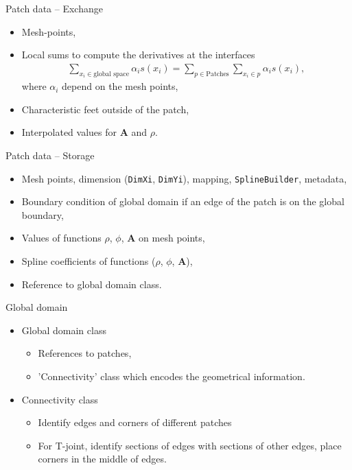\documentclass[
	english,%
	logo=false,%
	eurofusion=false, %
	titlegraphic=true, %
	]{ippbeamer}
\begin{document}
\begin{frame}{Patch data -- Exchange}
	\begin{itemize}
		\item Mesh-points,
		\item Local sums to compute the derivatives at the interfaces
				\begin{align*}
					\sum_{x_i \in \text{global space}} \alpha_i s(x_i) = \sum_{p \in\text{Patches}} 
							\sum_{x_i \in p} \alpha_i s(x_i),
				\end{align*}
		where $\alpha_i$ depend on the mesh points,
		\item Characteristic feet outside of the patch,
		\item Interpolated values for $\mathbf{A}$ and $\rho$.
	\end{itemize}
\end{frame}
\begin{frame}{Patch data -- Storage}
	\begin{itemize}
		\item Mesh points, dimension (\texttt{DimXi}, \texttt{DimYi}), mapping,
				\texttt{SplineBuilder}, metadata, 
		\item Boundary condition of global domain if an edge of the patch is on the global boundary,
		\item Values of functions $\rho$, $\phi$, $\mathbf{A}$ on mesh points,
		\item Spline coefficients of functions ($\rho$, $\phi$, $\mathbf{A}$),
		\item Reference to global domain class.
	\end{itemize}
\end{frame}

\begin{frame}{Global domain}
	\begin{itemize}
		\item Global domain class
		\begin{itemize}
			\item References to patches,
			\item 'Connectivity' class which encodes the geometrical information.
		\end{itemize}
		\item Connectivity class
		\begin{itemize}
			\item Identify edges and corners of different patches
			\item For T-joint, identify sections of edges with sections of other edges, 
					place corners in the middle of edges.
		\end{itemize}
		
	\end{itemize}
	\end{frame}
\end{document}
